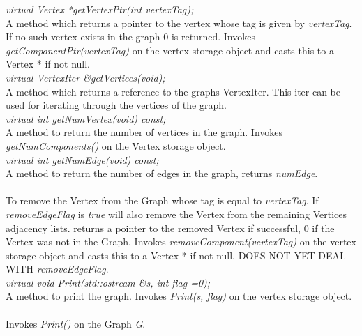 {\em virtual Vertex *getVertexPtr(int vertexTag);} \\
A method which returns a pointer to the vertex whose tag is given by {\em
vertexTag}. If no such vertex exists in the graph $0$ is
returned. Invokes {\em getComponentPtr(vertexTag)} on the vertex
storage object and casts this to a Vertex * if not null. \\

{\em virtual VertexIter \&getVertices(void);} \\
A method which returns a reference to the graphs VertexIter. This iter
can be used for iterating through the vertices of the graph. \\

{\em virtual int getNumVertex(void) const;} \\
A method to return the number of vertices in the graph. Invokes {\em
getNumComponents()} on the Vertex storage object.\\

{\em virtual int getNumEdge(void) const;} \\
A method to return the number of edges in the graph, returns {\em
numEdge}. \\ 

 \\
To remove the Vertex from the Graph whose tag is equal to {\em
vertexTag}. If {\em removeEdgeFlag} is {\em true} will also remove the
Vertex from the remaining Vertices adjacency lists. returns a pointer
to the removed Vertex if successful, $0$ if the Vertex was not in the
Graph. Invokes {\em removeComponent(vertexTag)} on the vertex
storage object and casts this to a Vertex * if not null. DOES NOT YET
DEAL WITH {\em removeEdgeFlag}. \\

{\em virtual void Print(std::ostream \&s, int flag =0);} \\
A method to print the graph. Invokes {\em Print(s, flag)} on the vertex
storage object. \\

 \\
Invokes {\em Print()} on the Graph {\em G}.